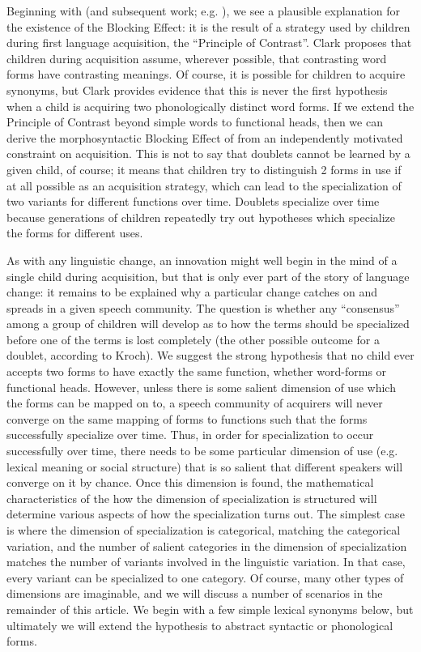 Beginning with \citet{clark1987} (and subsequent work; e.g. \citealt{clark1990}), we see a plausible explanation for the existence of the Blocking Effect: it is the result of a strategy used by children during first language acquisition, the ``Principle of Contrast''.
Clark proposes that children during acquisition assume, wherever possible, that contrasting word forms have contrasting meanings.
Of course, it is possible for children to acquire synonyms, but Clark provides evidence that this is never the first hypothesis when a child is acquiring two phonologically distinct word forms.
If we extend the Principle of Contrast beyond simple words to functional heads, then we can derive the morphosyntactic Blocking Effect of \citet{kroch1994} from an independently motivated constraint on acquisition.
This is not to say that doublets cannot be learned by a given child, of course; it means that children try to distinguish 2 forms in use if at all possible as an acquisition strategy, which can lead to the specialization of two variants for different functions over time.
Doublets specialize over time because generations of children repeatedly try out hypotheses which specialize the forms for different uses.

As with any linguistic change, an innovation might well begin in the mind of a single child during acquisition, but that is only ever part of the story of language change: it remains to be explained why a particular change catches on and spreads in a given speech community.
The question is whether any ``consensus'' among a group of children will develop as to how the terms should be specialized before one of the terms is lost completely (the other possible outcome for a doublet, according to Kroch).
We suggest the strong hypothesis that no child ever accepts two forms to have exactly the same function, whether word-forms or functional heads.
However, unless there is some salient dimension of use which the forms can be mapped on to, a speech community of acquirers will never converge on the same mapping of forms to functions such that the forms successfully specialize over time.
Thus, in order for specialization to occur successfully over time, there needs to be some particular dimension of use (e.g. lexical meaning or social structure) that is so salient that different speakers will converge on it by chance.
Once this dimension is found, the mathematical characteristics of the how the dimension of specialization is structured will determine various aspects of how the specialization turns out.
The simplest case is where the dimension of specialization is categorical, matching the categorical variation, and the number of salient categories in the dimension of specialization matches the number of variants involved in the linguistic variation. 
In that case, every variant can be specialized to one category.
Of course, many other types of dimensions are imaginable, and we will discuss a number of scenarios in the remainder of this article.
We begin with a few simple lexical synonyms below, but ultimately we will extend the hypothesis to abstract syntactic or phonological forms.


